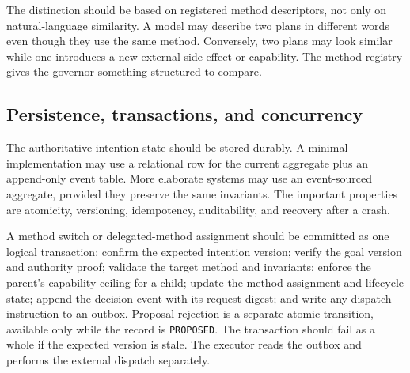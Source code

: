 The distinction should be based on registered method descriptors, not only on natural-language similarity. A model may describe two plans in different words even though they use the same method. Conversely, two plans may look similar while one introduces a new external side effect or capability. The method registry gives the governor something structured to compare.

\subsection{Persistence, transactions, and concurrency}

The authoritative intention state should be stored durably. A minimal implementation may use a relational row for the current aggregate plus an append-only event table. More elaborate systems may use an event-sourced aggregate, provided they preserve the same invariants. The important properties are atomicity, versioning, idempotency, auditability, and recovery after a crash.

A method switch or delegated-method assignment should be committed as one logical transaction: confirm the expected intention version; verify the goal version and authority proof; validate the target method and invariants; enforce the parent's capability ceiling for a child; update the method assignment and lifecycle state; append the decision event with its request digest; and write any dispatch instruction to an outbox. Proposal rejection is a separate atomic transition, available only while the record is \texttt{PROPOSED}. The transaction should fail as a whole if the expected version is stale. The executor reads the outbox and performs the external dispatch separately.

